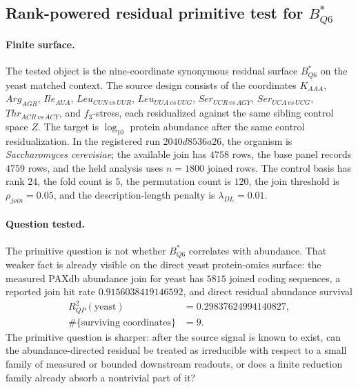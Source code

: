 
\subsection{Rank-powered residual primitive test for $B^{\ast}_{Q6}$}
\label{subsec:b-star-q6-residual-primitive-powered}

\paragraph{Finite surface.}
The tested object is the nine-coordinate synonymous residual surface $B^{\ast}_{Q6}$ on the yeast matched context.  The source design consists of the coordinates $K_{AAA}$, $Arg_{AGR}$, $Ile_{AUA}$, $Leu_{CUN\,vs\,UUR}$, $Leu_{UUA\,vs\,UUG}$, $Ser_{UCR\,vs\,AGY}$, $Ser_{UCA\,vs\,UCG}$, $Thr_{ACR\,vs\,ACY}$, and $f_3$-stress, each residualized against the same sibling control space $Z$.  The target is $\log_{10}$ protein abundance after the same control residualization.  In the registered run $2040d8536a26$, the organism is \emph{Saccharomyces cerevisiae}; the available join has $4758$ rows, the base panel records $4759$ rows, and the held analysis uses $n=1800$ joined rows.  The control basis has rank $24$, the fold count is $5$, the permutation count is $120$, the join threshold is $\rho_{join}=0.05$, and the description-length penalty is $\lambda_{DL}=0.01$.

\paragraph{Question tested.}
The primitive question is not whether $B^{\ast}_{Q6}$ correlates with abundance.  That weaker fact is already visible on the direct yeast protein-omics surface: the measured PAXdb abundance join for yeast has $5815$ joined coding sequences, a reported join hit rate $0.9156038419146592$, and direct residual abundance survival
$$
\begin{aligned}
R^2_{QP}(\text{yeast}) &= 0.29837624994140827,\\
\#\{\text{surviving coordinates}\} &= 9.
\end{aligned}
$$
The primitive question is sharper: after the source signal is known to exist, can the abundance-directed residual be treated as irreducible with respect to a small family of measured or bounded downstream readouts, or does a finite reduction family already absorb a nontrivial part of it?

